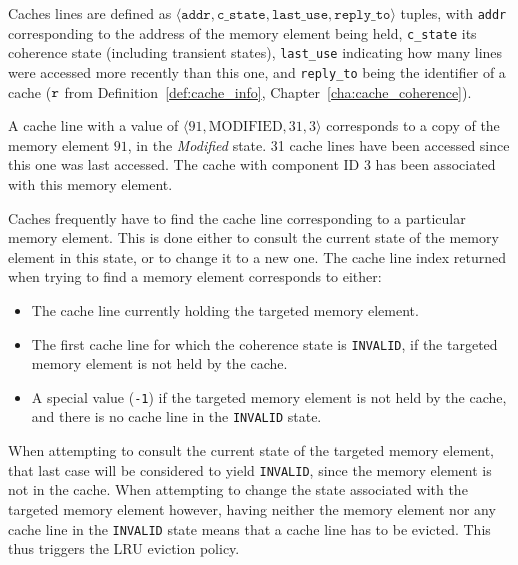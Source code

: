 \begin{definition}
\label{def:cache_line_model}
Caches lines are defined as $\langle \texttt{addr}, \texttt{c\_state},
\texttt{last\_use}, \texttt{reply\_to} \rangle$ tuples, with \texttt{addr}
corresponding to the address of the memory element being held, \texttt{c\_state}
its coherence state (including transient states), \texttt{last\_use} indicating
how many lines were accessed more recently than this one, and \texttt{reply\_to}
being the identifier of a cache ($\text{\texttt{r}}{}$ from
Definition~\ref{def:cache_info}, Chapter~\ref{cha:cache_coherence}).
\end{definition}
\begin{example}
A cache line with a value of $\langle 91, \text{MODIFIED}, 31, 3 \rangle$
corresponds to a copy of the memory element $91$, in the \textit{Modified}
state. 31 cache lines have been accessed since this one was last accessed. The
cache with component ID 3 has been associated with this memory element.
\end{example}

Caches frequently have to find the cache line corresponding to a particular
memory element. This is done either to consult the current state of the memory
element in this state, or to change it to a new one. The cache line index
returned when trying to find a memory element corresponds to either:
\begin{itemize}
\item The cache line currently holding the targeted memory element.
\item
   The first cache line for which the coherence state is \lstinline!INVALID!,
   if the targeted memory element is not held by the cache.
\item
   A special value (\lstinline!-1!) if the  targeted memory element is not held
   by the cache, and there is no cache line in the \lstinline!INVALID! state.
\end{itemize}
When attempting to consult the current state of the targeted memory element,
that last case will be considered to yield \lstinline!INVALID!, since the memory
element is not in the cache. When attempting to change the state
associated with the targeted memory element however, having neither the memory
element nor any cache line in the \lstinline!INVALID! state means that a cache
line has to be evicted. This thus triggers the LRU eviction policy.
\iffalse
\lstset{%
   escapeinside={(*}{*)},%
   keywordstyle=\bfseries,%
   morekeywords={while,let,in,if,then,else,def,foreach},%
   numbers=none%
}
\begin{lstlisting}
result (*$\gets$*) -1
i (*$\gets$*) 0
while (i < LINES_PER_CACHE)
   if (cache_line[i].addr == TARGET)
      result (*$\gets$*) i
      break
   if ((result == -1) && (cache_line[i].c_state == INVALID))
      result (*$\gets$*) i
   i (*$\gets$*) i + 1
\end{lstlisting}
\fi

